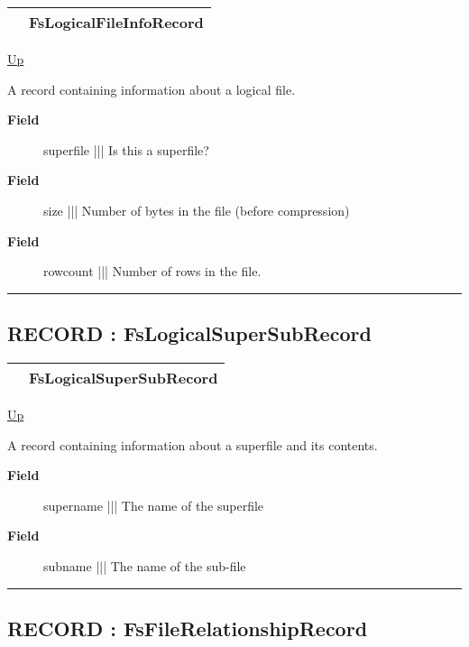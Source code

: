 {\renewcommand{\arraystretch}{1.5}
\begin{tabularx}{\textwidth}{|>{\raggedright\arraybackslash}l|X|}
\hline
\hspace{0pt} & FsLogicalFileInfoRecord \\
\hline
\end{tabularx}
}

\hyperlink{ecldoc:File}{Up}

\par
A record containing information about a logical file.

\par
\begin{description}
\item [\textbf{Field}] superfile ||| Is this a superfile?
\item [\textbf{Field}] size ||| Number of bytes in the file (before compression)
\item [\textbf{Field}] rowcount ||| Number of rows in the file.
\end{description}

\rule{\textwidth}{0.4pt}
\subsection*{RECORD : FsLogicalSuperSubRecord}
\hypertarget{ecldoc:file.fslogicalsupersubrecord}{}

{\renewcommand{\arraystretch}{1.5}
\begin{tabularx}{\textwidth}{|>{\raggedright\arraybackslash}l|X|}
\hline
\hspace{0pt} & FsLogicalSuperSubRecord \\
\hline
\end{tabularx}
}

\hyperlink{ecldoc:File}{Up}

\par
A record containing information about a superfile and its contents.

\par
\begin{description}
\item [\textbf{Field}] supername ||| The name of the superfile
\item [\textbf{Field}] subname ||| The name of the sub-file
\end{description}

\rule{\textwidth}{0.4pt}
\subsection*{RECORD : FsFileRelationshipRecord}
\hypertarget{ecldoc:file.fsfilerelationshiprecord}{}

